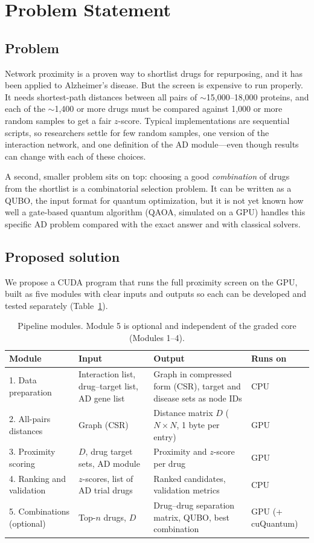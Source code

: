 \section{Problem Statement}
\label{sec:problem}

\subsection{Problem}

Network proximity is a proven way to shortlist drugs for repurposing, and it has been applied to Alzheimer's disease. But the screen is expensive to run properly. It needs shortest-path distances between all pairs of $\sim$15{,}000--18{,}000 proteins, and each of the $\sim$1{,}400 or more drugs must be compared against 1{,}000 or more random samples to get a fair $z$-score. Typical implementations are sequential scripts, so researchers settle for few random samples, one version of the interaction network, and one definition of the AD module---even though results can change with each of these choices.

A second, smaller problem sits on top: choosing a good \emph{combination} of drugs from the shortlist is a combinatorial selection problem. It can be written as a QUBO, the input format for quantum optimization, but it is not yet known how well a gate-based quantum algorithm (QAOA, simulated on a GPU) handles this specific AD problem compared with the exact answer and with classical solvers.

\subsection{Proposed solution}

We propose a CUDA program that runs the full proximity screen on the GPU, built as five modules with clear inputs and outputs so each can be developed and tested separately (Table~\ref{tab:modules}).

\begin{table}[h]
\centering
\small
\begin{tabularx}{\linewidth}{@{}lXXl@{}}
\toprule
Module & Input & Output & Runs on \\
\midrule
1. Data preparation & Interaction list, drug--target list, AD gene list & Graph in compressed form (CSR), target and disease sets as node IDs & CPU \\
2. All-pairs distances & Graph (CSR) & Distance matrix $D$ ($N\times N$, 1 byte per entry) & GPU \\
3. Proximity scoring & $D$, drug target sets, AD module & Proximity and $z$-score per drug & GPU \\
4. Ranking and validation & $z$-scores, list of AD trial drugs & Ranked candidates, validation metrics & CPU \\
5. Combinations (optional) & Top-$n$ drugs, $D$ & Drug--drug separation matrix, QUBO, best combination & GPU (+ cuQuantum) \\
\bottomrule
\end{tabularx}
\caption{Pipeline modules. Module 5 is optional and independent of the graded
core (Modules 1--4).}
\label{tab:modules}
\end{table}

